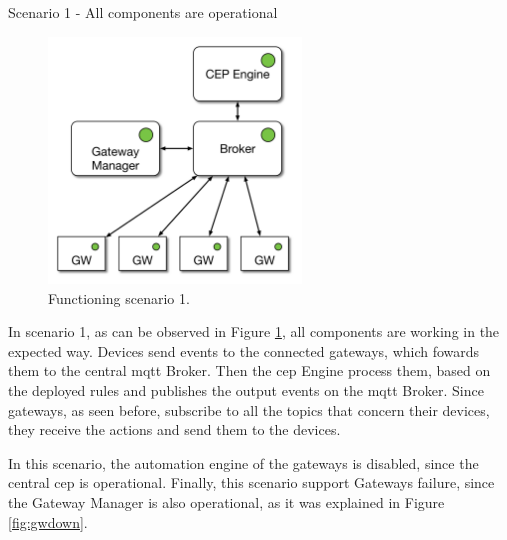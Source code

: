 \begin{Paragraph}{Scenario 1 - All components are operational}
\begin{figure}[H]
	\centering
	\includegraphics[width=0.6\textwidth]{figures/fs1.png}
	\caption{Functioning scenario 1.}
	\label{fig:fs1}
\end{figure}

In scenario 1, as can be observed in Figure \ref{fig:fs1}, all components are working in the expected way. Devices send events to the connected gateways, which fowards them to the central \ac{mqtt} Broker. Then the \ac{cep} Engine process them, based on the deployed rules and publishes the output events on the \ac{mqtt} Broker. Since gateways, as seen before, subscribe to all the topics that concern their devices, they receive the actions and send them to the devices.

In this scenario, the automation engine of the gateways is disabled, since the central \ac{cep} is operational. Finally, this scenario support Gateways failure, since the Gateway Manager is also operational, as it was explained in Figure \ref{fig:gwdown}.

\end{Paragraph}

